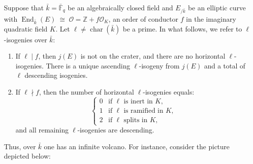 \documentclass[table]{amsart}
\newcommand{\F}{\mathbb{F}}
\numberwithin{equation}{section}
\begin{document}
\par Suppose that $\bar{k}=\bar{\F}_q$ be an algebraically closed field and $E_{/\bar{k}}$ be an elliptic curve with
$\operatorname{End}_{\bar{k}}(E)\;\cong\;\mathcal{O}=\mathbb{Z} + f\mathcal{O}_{K}$,
an order of conductor $f$ in the imaginary quadratic field $K$. Let $\ell\neq \operatorname{char}(\bar{k})$ be a prime. In what follows, we refer to $\ell$-isogenies over $\bar{k}$:
\begin{enumerate}
    \item If $\ell\mid f$, then $j(E)$ is not on the crater, and there are no horizontal $\ell$-isogenies. There is a unique ascending $\ell$-isogeny from $j(E)$ and a total of $\ell$ descending isogenies.
    \item If $\ell\nmid f$, then the number of horizontal $\ell$-isogenies equals:
    \[
    \begin{cases}
    0 & \text{if $\ell$ is inert in $K$},\\
    1 & \text{if $\ell$ is ramified in $K$},\\
    2 & \text{if $\ell$ splits in $K$},
    \end{cases}
    \]
    and all remaining $\ell$-isogenies are descending.
\end{enumerate}
Thus, over $\bar{k}$ one has an infinite volcano. For instance, consider the picture depicted below:
\end{document}
